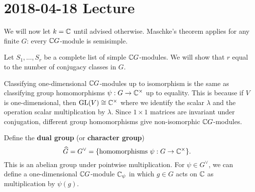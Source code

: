 \section{2018-04-18 Lecture}

\begin{rmk}
	We will now let $k=\mathbb{C}$ until advised otherwise.
	Maschke's theorem applies for any finite $G$: every $\mathbb{C} G$-module is semisimple.
\end{rmk}

Let $S_1,\ldots,S_r$ be a complete list of simple $\mathbb{C} G$-modules.
We will show that $r$ equal to the number of conjugacy classes in $G$.

\begin{rmk}
	Classifying one-dimensional $\mathbb{C} G$-modules up to isomorphism is the same as classifying group homomorphisms $\psi: G \to \mathbb{C}^\times$ up to equality.
	This is because if $V$ is one-dimensional, then $\operatorname{GL}(V) \cong \mathbb{C}^\times$ where we identify the scalar $\lambda$ and the operation scalar multiplication by $\lambda$.
	Since $1 \times 1$ matrices are invariant under conjugation, different group homomorphisms give non-isomorphic $\mathbb{C} G$-modules.
	
	Define the \textbf{dual group} (or \textbf{character group})
	\[\widehat G = G^\vee = \{\text{homomorphisms } \psi: G \to \mathbb{C}^\times\}.\]
	This is an abelian group under pointwise multiplication.
	For $\psi \in G^\vee$, we can define a one-dimensional $\mathbb{C} G$-module $\mathbb{C}_\psi$ in which $g \in G$ acts on $\mathbb{C}$ as multiplication by $\psi(g)$.
\end{rmk}

